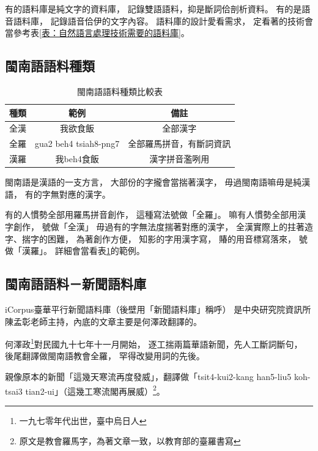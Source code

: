 有的語料庫是純文字的資料庫，
記錄雙語語料，抑是斷詞佮剖析資料。
有的是語音語料庫，
記錄語音佮伊的文字內容。
語料庫的設計愛看需求，
定看著的技術會當參考表\ref{表：自然語言處理技術需要的語料庫}。

\subsection{閩南語語料種類}
\label{節：閩南語語料種類}

\begin{table}
\caption{閩南語語料種類比較表}
\label{表：閩南語語料種類比較表}
\centering
\begin{tabular}{l|c|c}
種類 & 範例 & 備註\\
\hline
全漢 & 我欲食飯 & 全部漢字\\
全羅 & gua2 beh4 tsiah8-png7 & 全部羅馬拼音，有斷詞資訊\\
漢羅 &我beh4食飯 & 漢字拼音濫咧用\\
\end{tabular}
\end{table}

閩南語是漢語的一支方言，
大部份的字攏會當揣著漢字，
毋過閩南語嘛毋是純漢語，
有的字無對應的漢字。

有的人慣勢全部用羅馬拼音創作，
這種寫法號做「全羅」。
嘛有人慣勢全部用漢字創作，
號做「全漢」
毋過有的字無法度揣著對應的漢字，
全漢實際上的拄著造字、揣字的困難，
為著創作方便，
知影的字用漢字寫，
賰的用音標寫落來，
號做「漢羅」。
詳細會當看表\ref{表：閩南語語料種類比較表}的範例。

\subsection{閩南語語料－新聞語料庫}
\label{節：新聞語料庫}
iCorpus臺華平行新聞語料庫（後壁用「新聞語料庫」稱呼）\cite{iCorpus臺華平行新聞語料庫}
是中央研究院資訊所陳孟彰老師主持，內底的文章主要是何澤政翻譯的。

何澤政\footnote{一九七零年代出世，臺中烏日人}對民國九十七年十一月開始，
逐工揣兩篇華語新聞，先人工斷詞斷句，
後尾翻譯做閩南語教會全羅，
罕得改變用詞的先後。

親像原本的新聞「這幾天寒流再度發威」，翻譯做「tsit4-kui2-kang han5-liu5 koh-tsai3 tian2-ui」（這幾工寒流閣再展威）\footnote{原文是教會羅馬字，為著文章一致，以教育部的臺羅書寫}。

